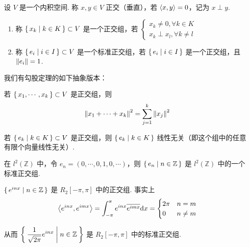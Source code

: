 
\begin{definition}
    设 $V$ 是一个内积空间. 称 $x,y\in V$ 正交（垂直），若 $\left\langle{x,y}\right\rangle=0$，记为 $x\perp y$.
\end{definition}

\begin{definition}    
    \begin{enumerate}
        \item 称 $\set{x_k|k\in K}\subset V$ 是一个正交组，若 $\begin{cases}
            x_k\ne 0,\forall k\in K\\
            x_k\perp x_l,\forall k\ne l
        \end{cases}$

        \item 称 $\set{e_i|i\in I}\subset V$ 是一个标准正交组，若 $\set{e_i|i\in I}$ 是一个正交组，且 $\left\lVert{e_i}\right\rVert=1$.
    \end{enumerate}
\end{definition}

我们有勾股定理的如下抽象版本：

\begin{property}
    若 $\set{x_1,\cdots,x_k}\subset V$ 是正交组，则
$$
\left\lVert{x_1+\cdots+x_k}\right\rVert^2=\sum_{j=1}^k\left\lVert{x_j}\right\rVert^2
$$
\end{property}

\begin{property}
    若 $\set{e_k|k\in K}\subset V$ 是正交组，则 $\set{e_k|k\in K}$ 线性无关（即这个组中的任意有限个向量线性无关）.
\end{property}

\begin{example}
    在 $l^2(\mathbb{Z})$ 中，令 $e_n=(0,\cdots,0,1,0,\cdots)$，则 $\set{e_n|n\in\mathbb{Z}}$ 是 $l^2(\mathbb{Z})$ 中的一个标准正交组.
\end{example}

\begin{example}
    $\set{e^{inx}|n\in\mathbb{Z}}$ 是 $R_2[-\pi,\pi]$ 中的正交组. 事实上
$$
\left\langle{e^{inx},e^{imx}}\right\rangle=\int_{-\pi}^{\pi}e^{inx}\overline{e^{imx}}\mathrm{d} x=\begin{cases}
    2\pi & n=m\\
    0 & n\ne m
\end{cases}
$$

    从而 $\displaystyle\Set{\frac{1}{\sqrt{2\pi}}e^{inx}|n\in\mathbb{Z}}$ 是 $R_2[-\pi,\pi]$ 中的标准正交组.
\end{example}

